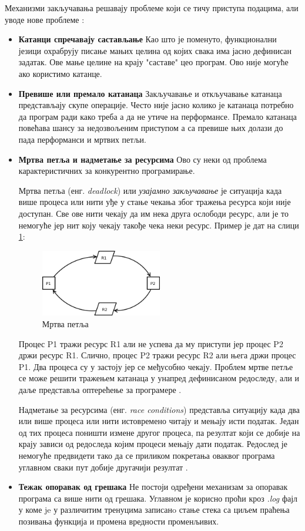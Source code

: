 \documentclass[12pt,oneside]{memoir}
\begin{document}
Механизми закључавања решавају проблеме који се тичу приступа подацима, али уводе нове проблеме \cite{progInScala3}:
\begin{itemize}
\item \textbf{Катанци спречавају састављање} Као што је поменуто, функционални језици охрабрују писање мањих целина од којих свака има јасно дефинисан задатак. Ове мање целине на крају "саставе" цео програм. Ово није могуће ако користимо катанце.
\item \textbf{Превише или премало катанаца} Закључавање и откључавање катанаца представљају скупе операције. Често није јасно колико је катанаца потребно да програм ради како треба а да не утиче на перформансе. Премало катанаца повећава шансу за недозвољеним приступом а са превише њих долази до пада перформанси и мртвих петљи.
\item \textbf{Мртва петља и надметање за ресурсима} Ово су неки од проблема карактеристичних за конкурентно програмирање.

Мртва петља (енг. \textit{deadlock}) или \textit{узајамно закључавање} је ситуација када више процеса или нити уђе у стање чекања због тражења ресурса који није доступан. Све ове нити чекају да им нека друга ослободи ресурс, али је то немогуће јер нит коју чекају такође чека неки ресурс. Пример је дат на слици \ref{fig:deadlock}:
\begin{figure}[!ht]
  \centering
  \includegraphics[width=0.5\textwidth]{deadlock.png}
  \caption{Мртва петља}
  \label{fig:deadlock}
\end{figure}
Процес P1 тражи ресурс R1 али не успева да му приступи јер процес P2 држи ресурс R1. Слично, процес P2 тражи ресурс R2 али њега држи процес P1. Два процеса су у застоју јер се међусобно чекају. Проблем мртве петље се може решити тражењем катанаца у унапред дефинисаном редоследу, али и даље представља оптерећење за програмере \cite{microsoftRaceC}.

\label{raceCon}
Надметање за ресурсима (енг. \textit{race conditions}) представља ситуацију када два или више процеса или нити истовремено читају и мењају исти податак. Један од тих процеса поништи измене другог процеса, па резултат који се добије на крају зависи од редоследа којим процеси мењају дати податак. Редослед је немогуће предвидети тако да се приликом покретања оваквог програма углавном сваки пут добије другачији резултат \cite{microsoftRaceC}.

\item \textbf{Тежак опоравак од грешака} Не постоји одређени механизам за опоравак програма са више нити од грешака. Углавном је корисно проћи кроз \textit{.log} фајл у коме je у различитим тренуцима записанo стање стека са циљем праћења позивања функција и промена вредности променљивих.
\end{itemize}
\end{document}
